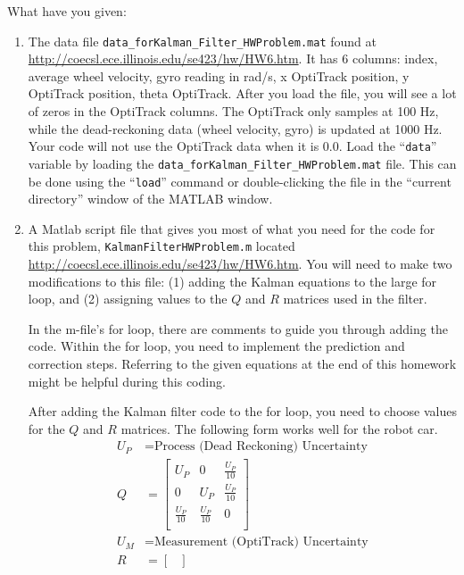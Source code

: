 \documentclass[11pt]{article}
\begin{document}
What have you given:
%
\begin{enumerate}
        \item The data file \verb|data_forKalman_Filter_HWProblem.mat| found at \url{http://coecsl.ece.illinois.edu/se423/hw/HW6.htm}. It has 6 columns: index, average wheel velocity, gyro reading in rad/s, x OptiTrack position, y OptiTrack position, theta OptiTrack. After you load the file, you will see a lot of zeros in the OptiTrack columns. The OptiTrack only samples at 100 Hz, while the dead-reckoning data (wheel velocity, gyro) is updated at 1000 Hz. Your code will not use the OptiTrack data when it is 0.0. Load the “\verb|data|” variable by loading the \verb|data_forKalman_Filter_HWProblem.mat| file. This can be done using the “\verb|load|” command or double-clicking the file in the “current directory” window of the MATLAB window.
        \item A Matlab script file that gives you most of what you need for the code for this problem, \verb|KalmanFilterHWProblem.m| located \url{http://coecsl.ece.illinois.edu/se423/hw/HW6.htm}. You will need to make two modifications to this file: (1) adding the Kalman equations to the large for loop, and (2) assigning values to the $Q$ and $R$ matrices used in the filter.
        \par
        In the m-file’s for loop, there are comments to guide you through adding the code. Within the for loop, you need to implement the prediction and correction steps. Referring to the given equations at the end of this homework might be helpful during this coding.
        \par
        After adding the Kalman filter code to the for loop, you need to choose values for the $Q$ and $R$ matrices. The following form works well for the robot car.
        \begin{align*}
            U_P &= \text{Process (Dead Reckoning) Uncertainty} \\
            Q &=
            \begin{bmatrix}
                U_P & 0 & \frac{U_P}{10} \\
                0 & U_P & \frac{U_P}{10} \\
                \frac{U_P}{10} & \frac{U_P}{10} & 0 \\
            \end{bmatrix} \\
            U_M &= \text{Measurement (OptiTrack) Uncertainty} \\
            R &=
            \begin{bmatrix}

\end{bmatrix}
\end{align*}
\end{enumerate}
\end{document}
